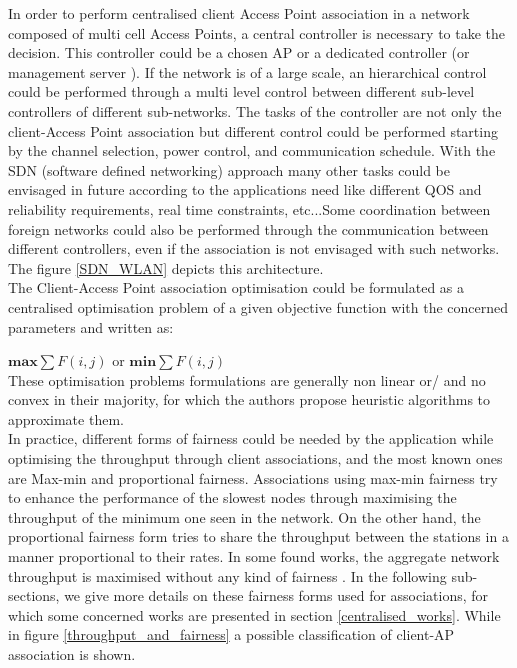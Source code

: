 \documentclass[journal,transmag]{IEEEtran}
\begin{document}
In order to perform centralised client Access Point association in a network composed of multi cell Access Points, a central controller is necessary to take the decision. This controller could be a chosen AP or a dedicated controller (or management server \cite{08proportional_fairness_multiRate_LAN}). If the network is of a large scale, an hierarchical control could be performed through a multi level control between different sub-level controllers of different sub-networks. The tasks of the controller are not only the client-Access Point association but different control could be performed starting by the channel selection, power control, and communication schedule. With the SDN (software defined networking) approach many other tasks could be envisaged in future according to the applications need like different QOS and reliability requirements, real time constraints, etc...Some coordination between foreign networks could also be performed through the communication between different controllers, even if the association is not envisaged with such networks. The figure \ref{SDN_WLAN} depicts this architecture.\\

The Client-Access Point association optimisation could be formulated as a centralised optimisation problem of a given objective function with the concerned parameters and written as:

$\textbf{max}  \sum\limits F(i,j)$ or  $\textbf{min}  \sum\limits F(i,j)$ \\

These optimisation problems formulations are generally non linear or/ and no convex in their majority, for which the authors propose heuristic algorithms to approximate them. \\

In practice, different forms of fairness could be needed by the application while optimising the throughput through client associations, and the most known ones are Max-min and proportional fairness. Associations using max-min fairness try to enhance the performance of the slowest nodes through maximising the throughput of the minimum one seen in the network. On the other hand, the proportional fairness form tries to share the throughput between the stations in a manner proportional to their rates. In some found works, the aggregate network throughput is maximised without any kind of fairness \cite{15AP_association_MIMO}. In the following sub-sections, we give more details on these fairness forms used for associations, for which some concerned works are presented in section \ref{centralised_works}. While in figure \ref{throughput_and_fairness} a possible classification of client-AP association is shown.
\end{document}
